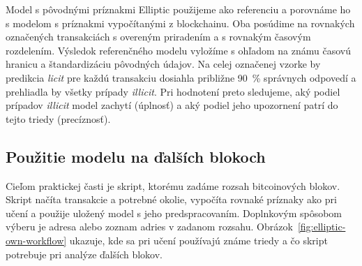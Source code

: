 Model s pôvodnými príznakmi Elliptic použijeme ako referenciu
a porovnáme ho s modelom s príznakmi vypočítanými z blockchainu.
Oba posúdime na rovnakých označených transakciách s overeným
priradením a s rovnakým časovým rozdelením. Výsledok referenčného
modelu vyložíme s ohľadom na známu časovú hranicu a štandardizáciu
pôvodných údajov. Na celej označenej vzorke by predikcia
\emph{licit} pre každú transakciu dosiahla približne 90~\% správnych
odpovedí a prehliadla by všetky prípady \emph{illicit}. Pri hodnotení
preto sledujeme, aký podiel prípadov \emph{illicit} model zachytí
(úplnosť) a aký podiel jeho upozornení patrí do tejto triedy
(precíznosť).

\subsection{Použitie modelu na ďalších blokoch}
\label{sec:elliptic-own-approach}

Cieľom praktickej časti je skript, ktorému zadáme rozsah
bitcoinových blokov. Skript načíta transakcie a potrebné okolie,
vypočíta rovnaké príznaky ako pri učení a použije uložený model
s jeho predspracovaním. Doplnkovým spôsobom výberu je adresa
alebo zoznam adries v zadanom rozsahu. Obrázok~\ref{fig:elliptic-own-workflow}
ukazuje, kde sa pri učení používajú známe triedy a čo skript
potrebuje pri analýze ďalších blokov.

\begin{center}
  \begin{minipage}{\textwidth}
  \centering
  \captionsetup{type=figure}
  \caption{Učenie modelu a jeho použitie na ďalších blokoch.}
  \label{fig:elliptic-own-workflow}
  \end{minipage}
\end{center}

